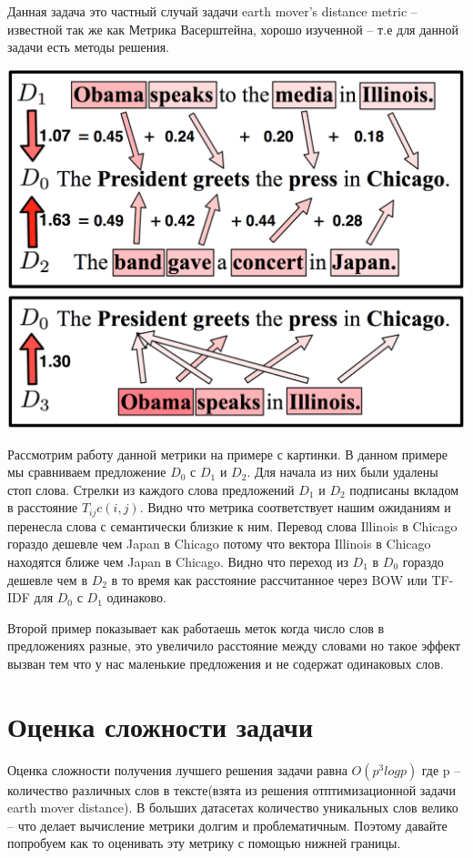 \documentclass[10pt,reqno]{amsart}
\theoremstyle{definition}
\theoremstyle{remark}
\begin{document}
Данная задача это частный случай задачи earth mover’s distance metric -- известной так же как Метрика Васерштейна, хорошо изученной -- т.е для данной задачи есть методы решения.



\includegraphics[width=0.8 \textwidth]{1.png}

Рассмотрим работу данной метрики на примере с картинки. В данном примере мы сравниваем предложение $D_0$ с $D_1$ и $D_2$. Для начала из них были удалены стоп слова. Стрелки из каждого слова предложений $D_1$ и $D_2$ подписаны вкладом в расстояние $T_{ij}c(i,j)$. Видно что метрика соответствует нашим ожиданиям и перенесла слова с семантически близкие к ним. Перевод слова Illinois в Chicago гораздо дешевле чем  Japan в Chicago потому что вектора Illinois в Chicago находятся ближе чем Japan в Chicago. Видно что переход из $D_1$ в $D_0$  гораздо дешевле чем в $D_2$ в то время как расстояние рассчитанное через BOW или TF-IDF для $D_0$ с $D_1$ одинаково.

Второй пример показывает как работаешь меток когда число слов в предложениях разные, это увеличило расстояние между словами но такое эффект вызван тем что у нас маленькие предложения и не содержат одинаковых слов.

\section{Оценка сложности задачи}

Оценка сложности получения лучшего решения задачи равна $O(p^3log p)$ где p -- количество различных слов в тексте(взята из решения отптимизационной задачи earth mover distance). В больших датасетах количество уникальных слов велико -- что делает вычисление метрики долгим и проблематичным. Поэтому давайте попробуем как то оценивать эту метрику с помощью нижней границы.
\end{document}
